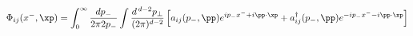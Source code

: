 \begin{equation}
    \Phi_{ij}(x^-,\xp) =
    \int_0^\infty \frac{dp_-}{2\pi 2p_-}
    \int \frac{d^{\,d-2}p_\perp}{(2\pi)^{d-2}}  \left[
    a_{ij}(p_-,\pp) e^{ ip_- x^- + i\pp\cdot\xp} +
    a^\dagger_{ij}(p_-,\pp) e^{ -ip_- x^- - i\pp\cdot\xp}
    \right]
\end{equation}


